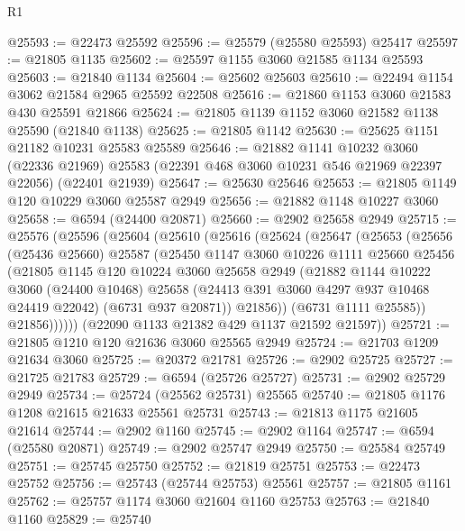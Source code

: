 \begin{lexlean}{R1}
\begin{coremodule}
@25593 := @22473 @25592
@25596 := @25579 (@25580 @25593) @25417
@25597 := @21805 @1135
@25602 := @25597 @1155 @3060 @21585 @1134 @25593
@25603 := @21840 @1134
@25604 := @25602 @25603
@25610 := @22494 @1154 @3062 @21584 @2965 @25592 @22508
@25616 := @21860 @1153 @3060 @21583 @430 @25591 @21866
@25624 := @21805 @1139 @1152 @3060 @21582 @1138 @25590 (@21840 @1138)
@25625 := @21805 @1142
@25630 := @25625 @1151 @21182 @10231 @25583 @25589
@25646 := @21882
    @1141
    @10232
    @3060
    (@22336 @21969)
    @25583
    (@22391 @468 @3060 @10231 @546 @21969 @22397 @22056)
    (@22401 @21939)
@25647 := @25630 @25646
@25653 := @21805 @1149 @120 @10229 @3060 @25587 @2949
@25656 := @21882 @1148 @10227 @3060
@25658 := @6594 (@24400 @20871)
@25660 := @2902 @25658 @2949
@25715 := @25576
    (@25596
      (@25604
        (@25610
          (@25616
            (@25624
              (@25647
                (@25653
                  (@25656
                    (@25436 @25660)
                    @25587
                    (@25450
                      @1147
                      @3060
                      @10226
                      @1111
                      @25660
                      @25456
                      (@21805
                        @1145
                        @120
                        @10224
                        @3060
                        @25658
                        @2949
                        (@21882
                          @1144
                          @10222
                          @3060
                          (@24400 @10468)
                          @25658
                          (@24413 @391 @3060 @4297 @937 @10468 @24419 @22042)
                          (@6731 @937 @20871))
                        @21856))
                    (@6731 @1111 @25585))
                  @21856))))))
      (@22090 @1133 @21382 @429 @1137 @21592 @21597))
@25721 := @21805 @1210 @120 @21636 @3060 @25565 @2949
@25724 := @21703 @1209 @21634 @3060
@25725 := @20372 @21781
@25726 := @2902 @25725
@25727 := @21725 @21783
@25729 := @6594 (@25726 @25727)
@25731 := @2902 @25729 @2949
@25734 := @25724 (@25562 @25731) @25565
@25740 := @21805 @1176 @1208 @21615 @21633 @25561 @25731
@25743 := @21813 @1175 @21605 @21614
@25744 := @2902 @1160
@25745 := @2902 @1164
@25747 := @6594 (@25580 @20871)
@25749 := @2902 @25747 @2949
@25750 := @25584 @25749
@25751 := @25745 @25750
@25752 := @21819 @25751
@25753 := @22473 @25752
@25756 := @25743 (@25744 @25753) @25561
@25757 := @21805 @1161
@25762 := @25757 @1174 @3060 @21604 @1160 @25753
@25763 := @21840 @1160
@25829 := @25740

\end{coremodule}
\end{lexlean}
